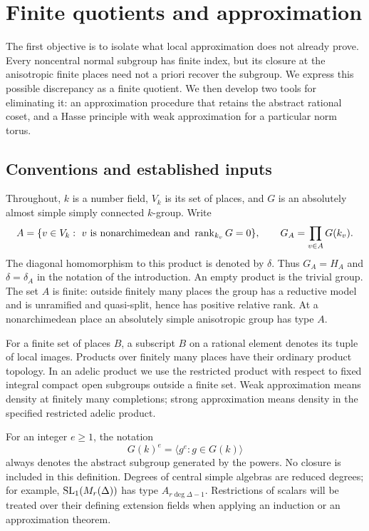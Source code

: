 \section{Finite quotients and approximation}\label{sec:foundations}

The first objective is to isolate what local approximation does not already
prove.  Every noncentral normal subgroup has finite index, but its closure
at the anisotropic finite places need not a priori recover the subgroup.
We express this possible discrepancy as a finite quotient.  We then
develop two tools for eliminating it: an approximation procedure that
retains the abstract rational coset, and a Hasse principle with weak
approximation for a particular norm torus.

\subsection{Conventions and established inputs}

Throughout, \(k\) is a number field, \(V_k\) is its set of places, and
\(G\) is an absolutely almost simple simply connected \(k\)-group.
Write
\[
 A=\{v\in V_k:\ v\text{ is nonarchimedean and }
                    \operatorname{rank}_{k_v}G=0\},\qquad
 G_A=\prod_{v\in A}G(k_v).
\]
The diagonal homomorphism to this product is denoted by \(\delta\).
Thus \(G_A=H_A\) and \(\delta=\delta_A\) in the notation of the introduction.
An empty product is the trivial group.  The set \(A\) is finite: outside
finitely many places the group has a reductive model and is unramified
and quasi-split, hence has positive relative rank.
At a nonarchimedean place an absolutely simple anisotropic group has
type \(A\).

For a finite set of places \(B\), a subscript \(B\) on a rational element
denotes its tuple of local images.  Products over finitely many places
have their ordinary product topology.  In an adelic product we use the
restricted product with respect to fixed integral compact open subgroups
outside a finite set.  Weak approximation means density at finitely many
completions; strong approximation means density in the specified
restricted adelic product.

For an integer \(e\geq 1\), the notation
\[
                 G(k)^e=\langle g^e:g\in G(k)\rangle
\]
always denotes the abstract subgroup generated by the powers.  No closure
is included in this definition.  Degrees of central simple algebras are
reduced degrees; for example, \(\operatorname{SL}_1(M_r(\Delta))\) has type
\(A_{r\deg\Delta-1}\).  Restrictions of scalars will be treated over
their defining extension fields when applying an induction or an
approximation theorem.

